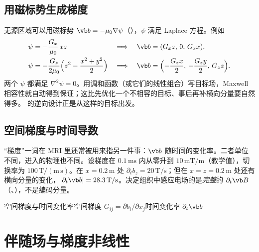 \subsection{用磁标势生成梯度}
无源区域可以用磁标势 $\vb b=-\mu_0\nabla\psi$（），$\psi$ 满足 Laplace 方程。例如
\begin{equation}
\begin{aligned}
\psi&=-\frac{G_x}{\mu_0}\,xz &&\Longrightarrow\quad \vb b=(G_xz,\,0,\,G_xx),\\
\psi&=-\frac{G_z}{2\mu_0}\Bigl(z^2-\frac{x^2+y^2}{2}\Bigr) &&\Longrightarrow\quad \vb b=\Bigl(-\frac{G_zx}{2},\,-\frac{G_zy}{2},\,G_zz\Bigr).
\end{aligned}
\end{equation}
两个 $\psi$ 都满足 $\nabla^2\psi=0$。用调和函数（或它们的线性组合）写目标场，Maxwell 相容性就自动得到保证；这比先优化一个不相容的目标、事后再补横向分量要自然得多。 的逆向设计正是从这样的目标出发。

\subsection{空间梯度与时间导数}
“梯度”一词在 MRI 里还常被用来指另一件事：$\vb b$ 随时间的变化率。二者单位不同，进入的物理也不同。设梯度在 $0.1\,\mathrm{ms}$ 内从零升到 $10\,\mathrm{mT/m}$（教学值），切换率为 $100\,\mathrm{T/(m\,s)}$。在 $x=0.2\,\mathrm m$ 处 $\partial_tb_z=20\,\mathrm{T/s}$；但在 $x=z=0.2\,\mathrm m$ 处还有横向分量的变化，$|\partial_t\vb b|=28.3\,\mathrm{T/s}$。决定组织中感应电场的是\emph{完整}的 $\partial_t\vb B$（、），不是编码分量。

\begin{compare}{空间梯度与时间变化率}{空间梯度 $G_{ij}=\partial b_i/\partial x_j$}{时间变化率 $\partial_t\vb b$}
\end{compare}

\section{伴随场与梯度非线性}\label{sec:mri-concomitant}

